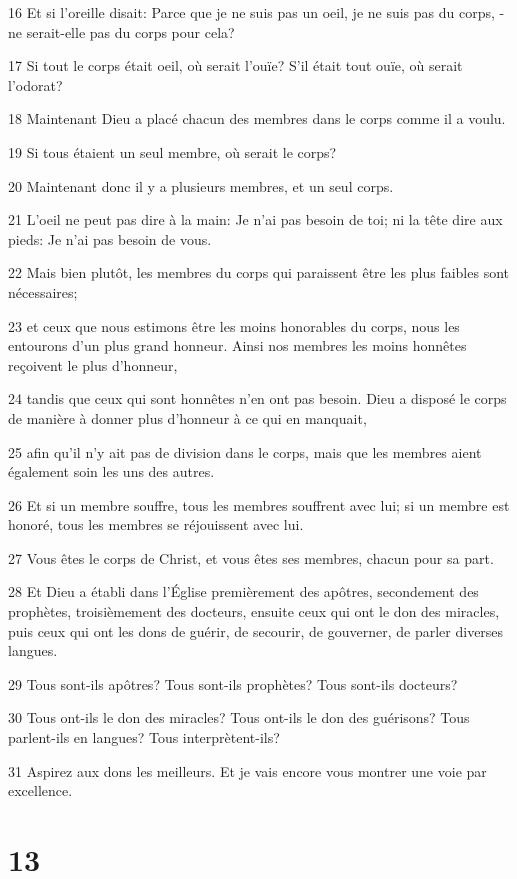 \par 16 Et si l'oreille disait: Parce que je ne suis pas un oeil, je ne suis pas du corps, -ne serait-elle pas du corps pour cela?
\par 17 Si tout le corps était oeil, où serait l'ouïe? S'il était tout ouïe, où serait l'odorat?
\par 18 Maintenant Dieu a placé chacun des membres dans le corps comme il a voulu.
\par 19 Si tous étaient un seul membre, où serait le corps?
\par 20 Maintenant donc il y a plusieurs membres, et un seul corps.
\par 21 L'oeil ne peut pas dire à la main: Je n'ai pas besoin de toi; ni la tête dire aux pieds: Je n'ai pas besoin de vous.
\par 22 Mais bien plutôt, les membres du corps qui paraissent être les plus faibles sont nécessaires;
\par 23 et ceux que nous estimons être les moins honorables du corps, nous les entourons d'un plus grand honneur. Ainsi nos membres les moins honnêtes reçoivent le plus d'honneur,
\par 24 tandis que ceux qui sont honnêtes n'en ont pas besoin. Dieu a disposé le corps de manière à donner plus d'honneur à ce qui en manquait,
\par 25 afin qu'il n'y ait pas de division dans le corps, mais que les membres aient également soin les uns des autres.
\par 26 Et si un membre souffre, tous les membres souffrent avec lui; si un membre est honoré, tous les membres se réjouissent avec lui.
\par 27 Vous êtes le corps de Christ, et vous êtes ses membres, chacun pour sa part.
\par 28 Et Dieu a établi dans l'Église premièrement des apôtres, secondement des prophètes, troisièmement des docteurs, ensuite ceux qui ont le don des miracles, puis ceux qui ont les dons de guérir, de secourir, de gouverner, de parler diverses langues.
\par 29 Tous sont-ils apôtres? Tous sont-ils prophètes? Tous sont-ils docteurs?
\par 30 Tous ont-ils le don des miracles? Tous ont-ils le don des guérisons? Tous parlent-ils en langues? Tous interprètent-ils?
\par 31 Aspirez aux dons les meilleurs. Et je vais encore vous montrer une voie par excellence.

\chapter{13}


